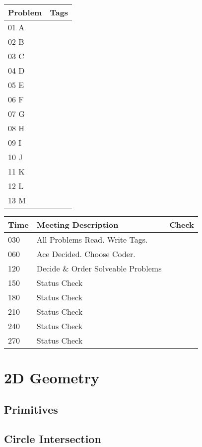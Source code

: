 \documentclass[twocolumn]{article}
\begin{document}
	\tableofcontents

	\begin{tabular}{| l || m{7cm} | }
		\hline
		\textbf{Problem} & \textbf{Tags}\\	\hline
		01 A & \\	\hline
		02 B & \\	\hline
		03 C & \\	\hline
		04 D & \\	\hline
		05 E & \\	\hline
		06 F & \\	\hline
		07 G & \\	\hline
		08 H & \\	\hline
		09 I & \\	\hline
		10 J & \\	\hline
		11 K & \\	\hline
		12 L & \\	\hline
		13 M & \\	\hline
	\end{tabular}
	\newline\newline\newline
	\begin{tabular}{| l | l || m{12mm}| }
		\hline
		\textbf{Time} & \textbf{Meeting Description} & \textbf{Check} \\	\hline
		030 & All Problems Read. Write Tags. & 	\\	\hline
		060 & Ace Decided. Choose Coder.	&	\\	\hline
		120 & Decide \& Order Solveable Problems &	\\	\hline
		150 & Status Check &	\\	\hline
		180 & Status Check &	\\	\hline
		210 & Status Check &	\\	\hline
		240 & Status Check &	\\	\hline
		270 & Status Check &	\\	\hline
	\end{tabular}
	\newpage

	\section{2D Geometry}
		\subsection{Primitives}
			
		\subsection{Circle Intersection}
\end{document}
